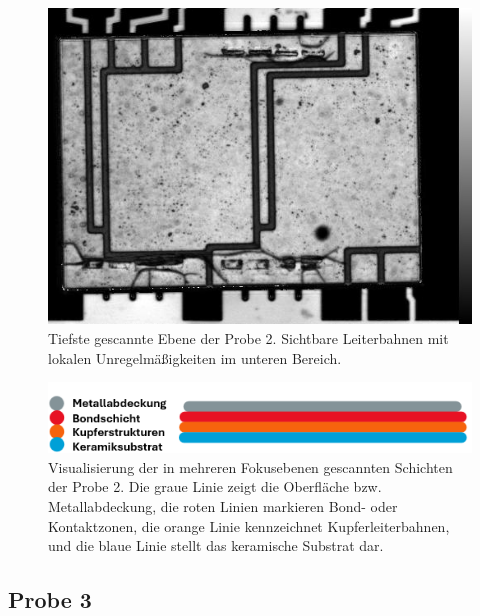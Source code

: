 \begin{figure}[H]
    \centering
    \includegraphics[scale=0.30]{Bilder/Probe2_i794_x005.jpg}
    \caption{Tiefste gescannte Ebene der Probe 2. Sichtbare Leiterbahnen mit lokalen Unregelmäßigkeiten im unteren Bereich.}
    \label{Abbildung 10:probe2_5}
\end{figure}
\begin{figure}[H]
    \centering
    \includegraphics[scale=0.75]{Bilder/probelinie2}
    \caption{Visualisierung der in mehreren Fokusebenen gescannten Schichten der Probe 2. Die graue Linie zeigt die Oberfläche bzw. Metallabdeckung, die roten Linien markieren Bond- oder Kontaktzonen, die orange Linie kennzeichnet Kupferleiterbahnen, und die blaue Linie stellt das keramische Substrat dar.}
    \label{Abbildung 11 :Visualisierung der in mehreren Fokusebenen gescannten Schichten der Probe 2. Die graue Linie zeigt die Oberfläche bzw. Metallabdeckung, die roten Linien markieren Bond- oder Kontaktzonen, die orange Linie kennzeichnet Kupferleiterbahnen, und die blaue Linie stellt das keramische Substrat dar.}
\end{figure}

\subsection{Probe 3}

